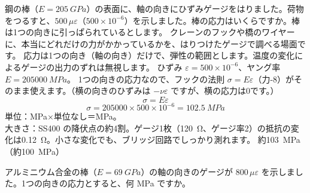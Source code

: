 \begin{phreidai}[ひずみゲージで応力を測る]
\label{ph:力-9:ex9}鋼の棒（$E=\qty{205}{GPa}$）の表面に、軸の向きにひずみゲージをはりました。荷物をつるすと、$500\,\mu\varepsilon$（$500\times10^{-6}$）を示しました。棒の応力はいくらですか。棒は1つの向きに引っぱられているとします。
\phbamen
クレーンのフックや橋のワイヤーに、本当にどれだけの力がかかっているかを、はりつけたゲージで調べる場面です。
\phmushi
応力は1つの向き（軸の向き）だけで、弾性の範囲とします。温度の変化によるゲージの出力のずれは無視します。
\phzu
ひずみ $\varepsilon=500\times10^{-6}$、ヤング率 $E=\qty{205000}{MPa}$。
\phriyu
1つの向きの応力なので、フックの法則 $\sigma=E\varepsilon$（力-8）がそのまま使えます。（横の向きのひずみは $-\nu\varepsilon$ ですが、横の応力は0です。）
\phtateru
\[\sigma=E\varepsilon\]
\phtoku
\[\sigma=\num{205000}\times500\times10^{-6}=\qty{102.5}{MPa}\]
\phtashikame
単位：MPa×単位なし＝MPa。\\
大きさ：SS400 の降伏点の約4割。ゲージ1枚（\qty{120}{\ohm}、ゲージ率2）の抵抗の変化は\qty{0.12}{\ohm}。小さな変化でも、ブリッジ回路でしっかり測れます。
\kotae 約\qty{103}{MPa}（約\qty{100}{MPa}）
\end{phreidai}
\begin{jibun}
アルミニウム合金の棒（$E=\qty{69}{GPa}$）の軸の向きのゲージが $800\,\mu\varepsilon$ を示しました。1つの向きの応力とすると、何 MPa ですか。
\end{jibun}

